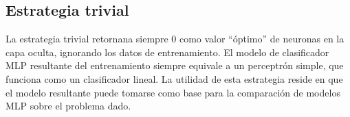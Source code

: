 %
\subsection{Estrategia trivial}
%
La estrategia trivial retornana siempre 0 como valor ``óptimo'' de neuronas
en la capa oculta, ignorando los datos de entrenamiento.
El modelo de clasificador MLP resultante del
entrenamiento siempre equivale a un perceptrón simple, que funciona
como un clasificador lineal.
La utilidad de esta estrategia reside en que el modelo resultante
puede tomarse como base para la comparación de modelos MLP sobre el
problema dado.
%
%
